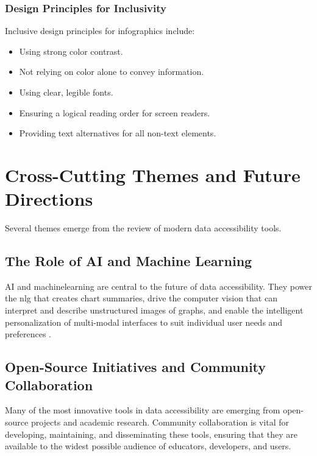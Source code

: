 \subsubsection{Design Principles for Inclusivity}\label{ch13:sssec:inclusive-design}
Inclusive design principles for infographics include:
\begin{itemize}
	\item Using strong color contrast.
	\item Not relying on color alone to convey information.
	\item Using clear, legible fonts.
	\item Ensuring a logical reading order for screen readers.
	\item Providing text alternatives for all non-text elements.
\end{itemize}
\supercite{DoNoHarmGuide, ContrastChecker, WCAG21LevelAA}

\section{Cross-Cutting Themes and Future Directions}\label{ch13:sec:future-directions}
Several themes emerge from the review of modern data accessibility tools.

\subsection{The Role of AI and Machine Learning}\label{ch13:ssec:ai-role}
\gls{AI} and \gls{machinelearning} are central to the future of data accessibility. They power the \gls{nlg} that creates chart summaries, drive the computer vision that can interpret and describe unstructured images of graphs, and enable the intelligent personalization of multi-modal interfaces to suit individual user needs and preferences \supercite{RECOG, NLGMeaning}.

\subsection{Open-Source Initiatives and Community Collaboration}\label{ch13:ssec:open-source}
Many of the most innovative tools in data accessibility are emerging from open-source projects and academic research. Community collaboration is vital for developing, maintaining, and disseminating these tools, ensuring that they are available to the widest possible audience of educators, developers, and users.

